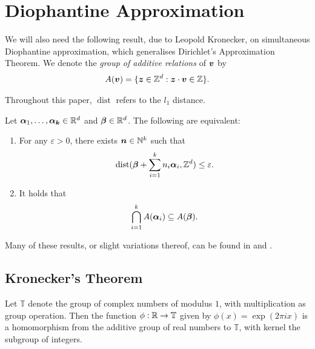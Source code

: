 
\section{Diophantine Approximation}

We will also need the following result, due to Leopold Kronecker, on simultaneous Diophantine approximation, which generalises Dirichlet's Approximation Theorem. We denote the \emph{group of additive relations} of $\boldsymbol{v}$ by
\begin{align*}
A(\boldsymbol{v}) = \lbrace \boldsymbol{z} \in \mathbb{Z}^{d} : \boldsymbol{z} \cdot \boldsymbol{v} \in \mathbb{Z} \rbrace .
\end{align*}

Throughout this paper, $\operatorname{dist}$ refers to the $l_{1}$ distance.

\begin{theorem}[Kronecker]
\label{thm:Kronecker}
Let $\boldsymbol{\alpha}_{1}, \ldots, \boldsymbol{\alpha_{k}} \in \mathbb{R}^{d}$ and $\boldsymbol{\beta} \in \mathbb{R}^{d}$. The following are equivalent:
\begin{enumerate}
\item For any $\varepsilon > 0$, there exists $\boldsymbol{n} \in \mathbb{N}^{k}$ such that
\begin{align*}
\operatorname{dist}(\boldsymbol{\beta} + \sum\limits_{i=1}^{k} n_{i} \boldsymbol{\alpha}_{i}, \mathbb{Z}^{d}) \leq \varepsilon .
\end{align*}
\item It holds that
\begin{align*}
\bigcap\limits_{i=1}^{k} A(\boldsymbol{\alpha}_{i}) \subseteq A(\boldsymbol{\beta}) .
\end{align*}
\end{enumerate}
\end{theorem}

Many of these results, or slight variations thereof, can be found in \cite{HardyAndWright} and \cite{Cassels}.




\subsection{Kronecker's Theorem}
Let $\mathbb{T}$ denote the group of complex numbers of modulus $1$,
with multiplication as group operation.  Then the function
$\phi:\mathbb{R} \rightarrow \mathbb{T}$ given by
$\phi(x)=\exp(2\pi i x)$ is a homomorphism from the additive
group of real numbers to $\mathbb{T}$, with kernel the subgroup of
integers.

